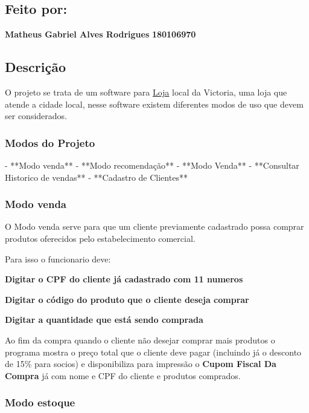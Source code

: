 \subsection*{Feito por\+:}

{\bfseries Matheus Gabriel Alves Rodrigues} {\bfseries 180106970} \subsection*{Descrição}

O projeto se trata de um software para \hyperlink{class_loja}{Loja} local da Victoria, uma loja que atende a cidade local, nesse software existem diferentes modos de uso que devem ser considerados.

\subsubsection*{Modos do Projeto}

\begin{DoxyVerb}- **Modo venda**
- **Modo recomendação**
- **Modo Venda**
- **Consultar Historico de vendas**
- **Cadastro de Clientes**
\end{DoxyVerb}


\subsubsection*{Modo venda}

O Modo venda serve para que um cliente previamente cadastrado possa comprar produtos oferecidos pelo estabelecimento comercial.

Para isso o funcionario deve\+:
\begin{DoxyItemize}
\item {\bfseries Digitar o C\+PF do cliente já cadastrado com 11 numeros}
\item {\bfseries Digitar o código do produto que o cliente deseja comprar}
\item {\bfseries Digitar a quantidade que está sendo comprada}
\end{DoxyItemize}

Ao fim da compra quando o cliente não desejar comprar mais produtos o programa mostra o preço total que o cliente deve pagar (incluindo já o desconto de 15\% para socios) e disponibiliza para impressão o {\bfseries Cupom Fiscal Da Compra} já com nome e C\+PF do cliente e produtos comprados.

\subsubsection*{Modo estoque}

